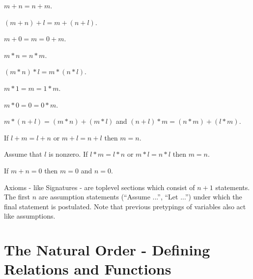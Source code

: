 \documentclass[11pt]{article}
\begin{document}
\begin{forthel}
\begin{axiom} $m + n = n + m$.
\end{axiom}

\begin{axiom} $(m + n) + l = m + (n + l)$.
\end{axiom}

\begin{axiom}  $m + 0 = m = 0 + m$.
\end{axiom}

\begin{axiom} $m * n = n * m$.
\end{axiom}

\begin{axiom} $(m * n) * l = m * (n * l)$.
\end{axiom}

\begin{axiom} $m * 1 = m = 1 * m$.
\end{axiom}

\begin{axiom} $m * 0 = 0 = 0 * m$.
\end{axiom}

\begin{axiom} $m * (n + l) = (m * n) + (m * l)$ and
                $(n + l) * m = (n * m) + (l * m)$.
\end{axiom}

\begin{axiom} If $l + m = l + n$ or $m + l = n + l$ 
then $m = n$.
\end{axiom}

\begin{axiom} Assume that $l$ is nonzero.
If $l * m = l * n$ or $m * l = n * l$ then $m = n$.
\end{axiom}

\begin{axiom} If $m + n = 0$ then $m = 0$ and $n = 0$.
\end{axiom}

\end{forthel}

Axioms - like Signatures - are toplevel sections which consist of
$n + 1$ statements. The first $n$ are assumption statements 
(``Assume ...'', ``Let ...'')
under which the final statement is postulated. Note that previous
pretypings of variables also act like assumptions.

\section{The Natural Order - Defining \\Relations and Functions}
\end{document}
